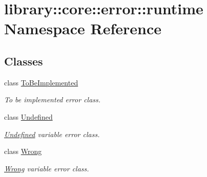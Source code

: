 \hypertarget{namespacelibrary_1_1core_1_1error_1_1runtime}{}\section{library\+::core\+::error\+::runtime Namespace Reference}
\label{namespacelibrary_1_1core_1_1error_1_1runtime}
\subsection*{Classes}
\begin{DoxyCompactItemize}
\item 
class \mbox{\hyperlink{classlibrary_1_1core_1_1error_1_1runtime_1_1_to_be_implemented}{To\+Be\+Implemented}}
\begin{DoxyCompactList}\small\item\em To be implemented error class. \end{DoxyCompactList}\item 
class \mbox{\hyperlink{classlibrary_1_1core_1_1error_1_1runtime_1_1_undefined}{Undefined}}
\begin{DoxyCompactList}\small\item\em \mbox{\hyperlink{classlibrary_1_1core_1_1error_1_1runtime_1_1_undefined}{Undefined}} variable error class. \end{DoxyCompactList}\item 
class \mbox{\hyperlink{classlibrary_1_1core_1_1error_1_1runtime_1_1_wrong}{Wrong}}
\begin{DoxyCompactList}\small\item\em \mbox{\hyperlink{classlibrary_1_1core_1_1error_1_1runtime_1_1_wrong}{Wrong}} variable error class. \end{DoxyCompactList}\end{DoxyCompactItemize}
